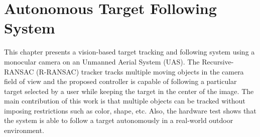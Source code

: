 \chapter{Autonomous Target Following System}
\label{chapter3}
This chapter presents a vision-based target tracking and following system using a monocular camera on an Unmanned Aerial System (UAS). The Recursive-RANSAC (R-RANSAC) tracker tracks multiple moving objects in the camera field of view and the proposed controller is capable of following a particular target selected by a user while keeping the target in the center of the image. The main contribution of this work is that multiple objects can be tracked without imposing restrictions such as color, shape, etc. Also, the hardware test shows that the system is able to follow a target autonomously in a real-world outdoor environment.

